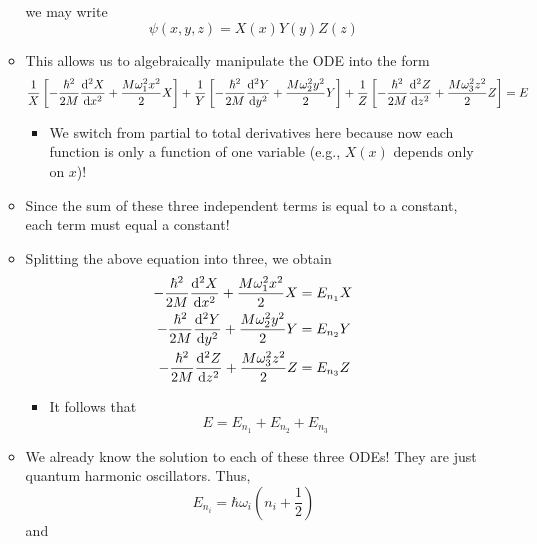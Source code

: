 \documentclass[../notes.tex]{subfiles}
\begin{document}
\begin{itemize}
\begin{itemize}
\begin{equation*}
        \end{equation*}
        we may write
        \begin{equation*}
            \psi(x,y,z) = X(x)Y(y)Z(z)
        \end{equation*}
        \item This allows us to algebraically manipulate the ODE into the form
        \begin{equation*}
            \frac{1}{X}\left[ -\frac{\hbar^2}{2M}\dv[2]{X}{x}+\frac{M\omega_1^2x^2}{2}X \right]+\frac{1}{Y}\left[ -\frac{\hbar^2}{2M}\dv[2]{Y}{y}+\frac{M\omega_2^2y^2}{2}Y \right]+\frac{1}{Z}\left[ -\frac{\hbar^2}{2M}\dv[2]{Z}{z}+\frac{M\omega_3^2z^2}{2}Z \right] = E
        \end{equation*}
        \begin{itemize}
            \item We switch from partial to total derivatives here because now each function is only a function of one variable (e.g., $X(x)$ depends only on $x$)!
        \end{itemize}
        \item Since the sum of these three independent terms is equal to a constant, each term must equal a constant!
        \item Splitting the above equation into three, we obtain
        \begin{align*}
            -\frac{\hbar^2}{2M}\dv[2]{X}{x}+\frac{M\omega_1^2x^2}{2}X &= E_{n_1}X\\
            -\frac{\hbar^2}{2M}\dv[2]{Y}{y}+\frac{M\omega_2^2y^2}{2}Y &= E_{n_2}Y\\
            -\frac{\hbar^2}{2M}\dv[2]{Z}{z}+\frac{M\omega_3^2z^2}{2}Z &= E_{n_3}Z
        \end{align*}
        \begin{itemize}
            \item It follows that
            \begin{equation*}
                E = E_{n_1}+E_{n_2}+E_{n_3}
            \end{equation*}
        \end{itemize}
        \item We already know the solution to each of these three ODEs! They are just quantum harmonic oscillators. Thus,
        \begin{equation*}
            E_{n_i} = \hbar\omega_i\left( n_i+\frac{1}{2} \right)
        \end{equation*}
        and
        \begin{equation*}

\end{equation*}
\end{itemize}
\end{itemize}
\end{document}
